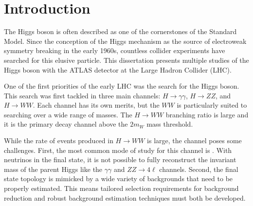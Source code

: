 \chapter{Introduction}
\label{introduction}

The Higgs boson is often described as one of the cornerstones of the Standard Model. Since the conception of the Higgs mechanism as the source of electroweak symmetry breaking in the early 1960s, countless collider experiments have searched for this elusive particle. This dissertation presents multiple studies of the Higgs boson with the ATLAS detector at the Large Hadron Collider (LHC). 

One of the first priorities of the early LHC was the search for the Higgs boson. This search was first tackled in three main channels: $H\to \gamma\gamma$, $H\to ZZ$, and $H\to WW$. Each channel has its own merits, but the $WW$ is particularly suited to searching over a wide range of masses. The $H\to WW$ branching ratio is large and it is the primary decay channel above the $2m_W$ mass threshold. 

While the rate of events produced in $H\to WW$ is large, the channel poses some challenges. First, the most common mode of study for this channel is \HWWfull. With neutrinos in the final state, it is not possible to fully reconstruct the invariant mass of the parent Higgs like the $\gamma\gamma$ and $ZZ\to 4\ell$ channels. Second, the final state topology is mimicked by a wide variety of backgrounds that need to be properly estimated. This means tailored selection requirements for background reduction and robust background estimation techniques must both be developed. 

